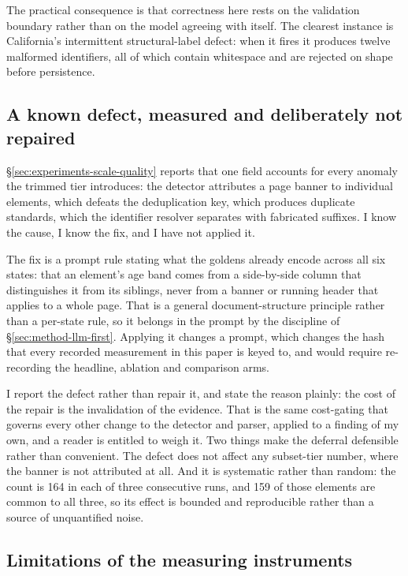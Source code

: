 The practical consequence is that correctness here rests on the validation
boundary rather than on the model agreeing with itself. The clearest instance is
California's intermittent structural-label defect: when it fires it produces
twelve malformed identifiers, all of which contain whitespace and are rejected
on shape before persistence.

\subsection{A known defect, measured and deliberately not repaired}
\label{sec:discussion-ageband-defect}

\S\ref{sec:experiments-scale-quality} reports that one field accounts for every
anomaly the trimmed tier introduces: the detector attributes a page banner to
individual elements, which defeats the deduplication key, which produces
duplicate standards, which the identifier resolver separates with fabricated
suffixes. I know the cause, I know the fix, and I have not applied it.

The fix is a prompt rule stating what the goldens already encode across all six
states: that an element's age band comes from a side-by-side column that
distinguishes it from its siblings, never from a banner or running header that
applies to a whole page. That is a general document-structure principle rather
than a per-state rule, so it belongs in the prompt by the discipline of
\S\ref{sec:method-llm-first}. Applying it changes a prompt, which changes the
hash that every recorded measurement in this paper is keyed to, and would
require re-recording the headline, ablation and comparison arms.

I report the defect rather than repair it, and state the reason plainly: the
cost of the repair is the invalidation of the evidence. That is the same
cost-gating that governs every other change to the detector and parser, applied to a
finding of my own, and a reader is entitled to weigh it. Two things make the
deferral defensible rather than convenient. The defect does not affect any
subset-tier number, where the banner is not attributed at all. And it is
systematic rather than random: the count is 164 in each of three consecutive
runs, and 159 of those elements are common to all three, so its effect is
bounded and reproducible rather than a source of unquantified noise.

\subsection{Limitations of the measuring instruments}


